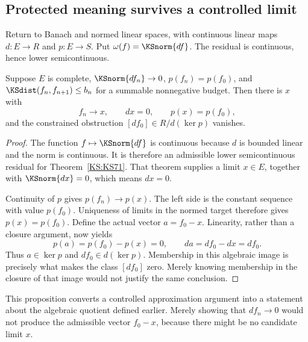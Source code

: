 \subsection{Protected meaning survives a controlled limit}
Return to Banach and normed linear spaces, with continuous linear maps \(d:E\to R\) and \(p:E\to S\). Put \(\omega(f)=\KSnorm{df}\). The residual is continuous, hence lower semicontinuous.

\begin{KSproposition}\label{KS:KS73}
Suppose \(E\) is complete, \(\KSnorm{df_n}\to0\), \(p(f_n)=p(f_0)\), and \(\KSdist(f_n,f_{n+1})\le b_n\) for a summable nonnegative budget. Then there is \(x\) with
\[
 f_n\to x,\qquad dx=0,\qquad p(x)=p(f_0),
\]
and the constrained obstruction \([df_0]\in R/d(\ker p)\) vanishes.
\end{KSproposition}
\begin{proof}
The function \(f\mapsto\KSnorm{df}\) is continuous because \(d\) is bounded linear and the norm is continuous. It is therefore an admissible lower semicontinuous residual for Theorem~\ref{KS:KS71}. That theorem supplies a limit \(x\in E\), together with \(\KSnorm{dx}=0\), which means \(dx=0\).

Continuity of \(p\) gives \(p(f_n)\to p(x)\). The left side is the constant sequence with value \(p(f_0)\). Uniqueness of limits in the normed target therefore gives \(p(x)=p(f_0)\). Define the actual vector \(a=f_0-x\). Linearity, rather than a closure argument, now yields
\[
 p(a)=p(f_0)-p(x)=0,\qquad da=df_0-dx=df_0.
\]
Thus \(a\in\ker p\) and \(df_0\in d(\ker p)\). Membership in this algebraic image is precisely what makes the class \([df_0]\) zero. Merely knowing membership in the closure of that image would not justify the same conclusion.
\end{proof}
This proposition converts a controlled approximation argument into a statement about the algebraic quotient defined earlier. Merely showing that \(df_n\to0\) would not produce the admissible vector \(f_0-x\), because there might be no candidate limit \(x\).

